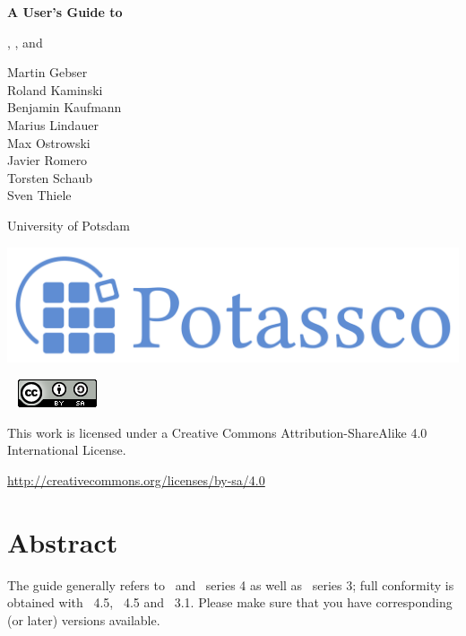 \thispagestyle{empty}
\bigskip
\noindent
{\Huge\bf
A User's Guide to 
\par
\bigskip
\noindent
\gringo, \clasp, and \clingo}

\bigskip
\bigskip

\noindent
Martin Gebser \\
Roland Kaminski \\
Benjamin Kaufmann \\
Marius Lindauer \\
Max Ostrowski \\
Javier Romero \\
Torsten Schaub \\
Sven Thiele 
\par
\bigskip
\noindent
University of Potsdam

\vfill

\noindent
\includegraphics[width=\textwidth]{potassco_logo_blue}
\bigskip

\newpage
\thispagestyle{empty}\ 
\vfill
\noindent
\includegraphics{CC-88x31.png}

\bigskip

\noindent
This work is licensed under a Creative Commons Attribution-ShareAlike 4.0\\ International License.

\medskip

\noindent
\url{http://creativecommons.org/licenses/by-sa/4.0}
\newpage
\thispagestyle{empty}\ 
\section*{Abstract}


\bigskip
\noindent
The guide generally refers to \gringo\ and \clingo\ series 4 as well as \clasp\ series 3;
full conformity is obtained with \gringo~4.5, \clingo~4.5 and \clasp~3.1.
Please make sure that you have corresponding (or later) versions available.

\vfill

